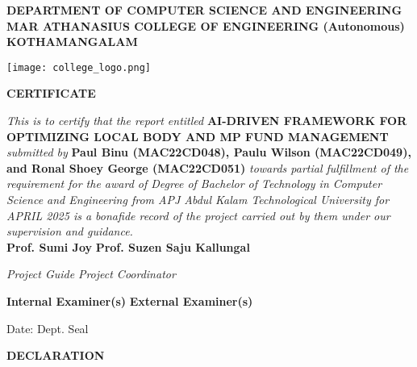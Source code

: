 \documentclass[12pt,a4paper]{report}
\begin{document}
\thispagestyle{empty}
\begin{center}

    \textbf{DEPARTMENT OF COMPUTER SCIENCE AND ENGINEERING \\
    MAR ATHANASIUS COLLEGE OF ENGINEERING (Autonomous)\\
    KOTHAMANGALAM} 

    \vspace{20pt}

    \texttt{[image: college\_logo.png]}
    \vspace{20pt}

    \textbf{CERTIFICATE} \\
    \vspace{20pt}
\end{center}
\justifying
\textit{This is to certify that the report entitled} \textbf{AI-DRIVEN FRAMEWORK FOR OPTIMIZING LOCAL BODY AND MP FUND MANAGEMENT }\textit{submitted by} \textbf{Paul Binu (MAC22CD048), Paulu Wilson (MAC22CD049), and Ronal Shoey George (MAC22CD051)}
 \textit{towards partial fulfillment of the requirement for the award of Degree of Bachelor of Technology in Computer Science and Engineering from APJ Abdul Kalam Technological University for APRIL 2025 is a bonafide record of the project carried out by them under our supervision and guidance.} \\  

\vspace{20pt}
\noindent \textbf{Prof. Sumi Joy} \hfill \textbf{Prof. Suzen Saju Kallungal} 

\noindent \textit{Project Guide} \hfill \textit{Project Coordinator}

\vspace{40pt}
\noindent \textbf{Internal Examiner(s)} \hfill \textbf{External Examiner(s)}


\vspace{40pt}
\noindent Date: \hfill Dept. Seal

\thispagestyle{empty}
\clearpage
\vspace{5cm}
\begin{center}
    
    \textbf{\filcenter\LARGE DECLARATION}
    \vspace{25pt}
\end{center}
\end{document}
